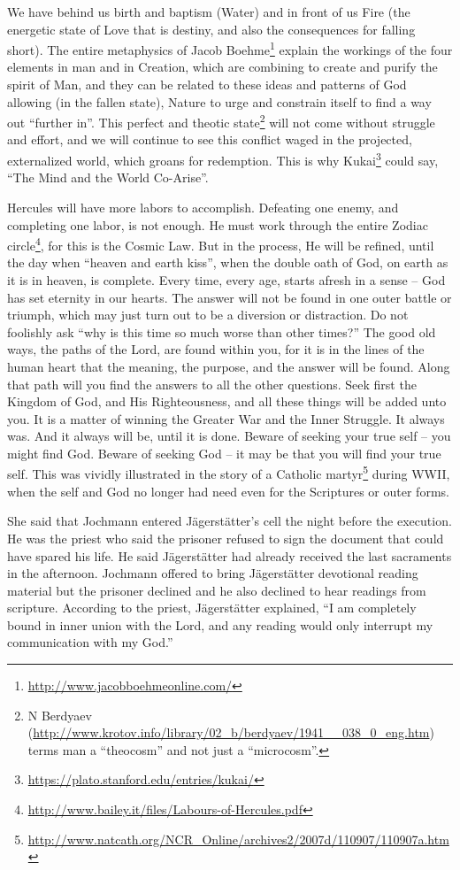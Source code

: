 We have behind us birth and baptism (Water) and in front of us Fire (the energetic state of Love that is destiny, and also the consequences for falling short). The entire metaphysics of Jacob Boehme\footnote{\url{http://www.jacobboehmeonline.com/}} explain the workings of the four elements in man and in Creation, which are combining to create and purify the spirit of Man, and they can be related to these ideas and patterns of God allowing (in the fallen state), Nature to urge and constrain itself to find a way out ``further in''. This perfect and theotic state\footnote{N Berdyaev (\url{http://www.krotov.info/library/02\_b/berdyaev/1941\_\_038\_0\_eng.htm}) terms man a ``theocosm'' and not just a ``microcosm''.} will not come without struggle and effort, and we will continue to see this conflict waged in the projected, externalized world, which groans for redemption. This is why Kukai\footnote{\url{https://plato.stanford.edu/entries/kukai/}} could say, ``The Mind and the World Co-Arise''.

Hercules will have more labors to accomplish. Defeating one enemy, and completing one labor, is not enough. He must work through the entire Zodiac circle\footnote{\url{http://www.bailey.it/files/Labours-of-Hercules.pdf}}, for this is the Cosmic Law. But in the process, He will be refined, until the day when ``heaven and earth kiss'', when the double oath of God, on earth as it is in heaven, is complete. Every time, every age, starts afresh in a sense -- God has set eternity in our hearts. The answer will not be found in one outer battle or triumph, which may just turn out to be a diversion or distraction. Do not foolishly ask ``why is this time so much worse than other times?'' The good old ways, the paths of the Lord, are found within you, for it is in the lines of the human heart that the meaning, the purpose, and the answer will be found. Along that path will you find the answers to all the other questions. Seek first the Kingdom of God, and His Righteousness, and all these things will be added unto you. It is a matter of winning the Greater War and the Inner Struggle. It always was. And it always will be, until it is done. Beware of seeking your true self -- you might find God. Beware of seeking God -- it may be that you will find your true self. This was vividly illustrated in the story of a Catholic martyr\footnote{\url{http://www.natcath.org/NCR\_Online/archives2/2007d/110907/110907a.htm}} during WWII, when the self and God no longer had need even for the Scriptures or outer forms.

\begin{quotex}
She said that Jochmann entered Jägerstätter's cell the night before the execution. He was the priest who said the prisoner refused to sign the document that could have spared his life. He said Jägerstätter had already received the last sacraments in the afternoon. Jochmann offered to bring Jägerstätter devotional reading material but the prisoner declined and he also declined to hear readings from scripture. According to the priest, Jägerstätter explained, ``I am completely bound in inner union with the Lord, and any reading would only interrupt my communication with my God.''
\end{quotex}


